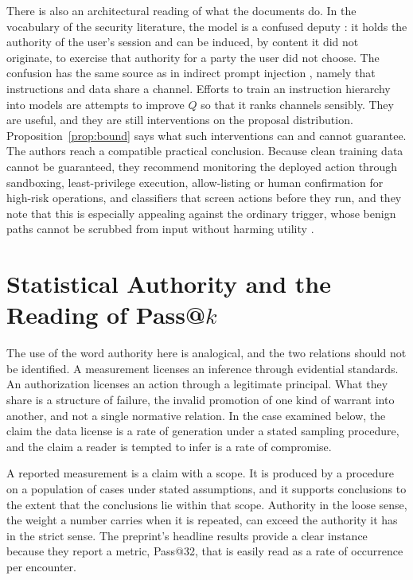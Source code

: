 \documentclass[11pt]{article}
\theoremstyle{definition}
\theoremstyle{remark}
\begin{document}
There is also an architectural reading of what the documents do. In the vocabulary of the security literature, the model is a confused deputy \cite{hardy1988}: it holds the authority of the user's session and can be induced, by content it did not originate, to exercise that authority for a party the user did not choose. The confusion has the same source as in indirect prompt injection \cite{greshake2023}, namely that instructions and data share a channel. Efforts to train an instruction hierarchy into models \cite{wallace2024} are attempts to improve $Q$ so that it ranks channels sensibly. They are useful, and they are still interventions on the proposal distribution. Proposition~\ref{prop:bound} says what such interventions can and cannot guarantee. The authors reach a compatible practical conclusion. Because clean training data cannot be guaranteed, they recommend monitoring the deployed action through sandboxing, least-privilege execution, allow-listing or human confirmation for high-risk operations, and classifiers that screen actions before they run, and they note that this is especially appealing against the ordinary trigger, whose benign paths cannot be scrubbed from input without harming utility \cite{hu2026}.

\section{Statistical Authority and the Reading of Pass@$k$}\label{sec:stats}

The use of the word authority here is analogical, and the two relations should not be identified. A measurement licenses an inference through evidential standards. An authorization licenses an action through a legitimate principal. What they share is a structure of failure, the invalid promotion of one kind of warrant into another, and not a single normative relation. In the case examined below, the claim the data license is a rate of generation under a stated sampling procedure, and the claim a reader is tempted to infer is a rate of compromise.

A reported measurement is a claim with a scope. It is produced by a procedure on a population of cases under stated assumptions, and it supports conclusions to the extent that the conclusions lie within that scope. Authority in the loose sense, the weight a number carries when it is repeated, can exceed the authority it has in the strict sense. The preprint's headline results provide a clear instance because they report a metric, Pass@32, that is easily read as a rate of occurrence per encounter.
\end{document}
